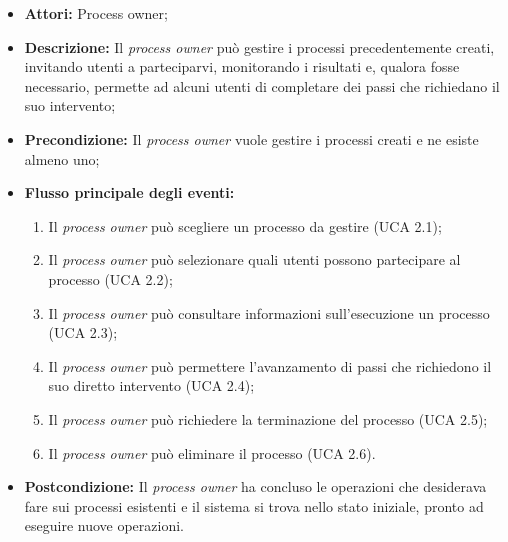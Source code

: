 \begin{itemize}
\item \textbf{Attori:} Process owner;
\item \textbf{Descrizione:}
Il \textit{process owner} può gestire i processi precedentemente creati, invitando utenti a parteciparvi, monitorando i risultati e, qualora fosse necessario, permette ad alcuni utenti di completare dei passi che richiedano il suo intervento;
\item \textbf{Precondizione:}
Il \textit{process owner} vuole gestire i processi creati e ne esiste almeno uno;
\item \textbf{Flusso principale degli eventi:}
\begin{enumerate}
\item Il \textit{process owner} può scegliere un processo da gestire (UCA 2.1);
\item Il \textit{process owner} può selezionare quali utenti possono partecipare al processo (UCA 2.2);
\item Il \textit{process owner} può consultare informazioni sull'esecuzione un processo (UCA 2.3);
\item Il \textit{process owner} può permettere l'avanzamento di passi che richiedono il suo diretto intervento (UCA 2.4);
\item Il \textit{process owner} può richiedere la terminazione del processo (UCA 2.5);
\item Il \textit{process owner} può eliminare il processo (UCA 2.6).
\end{enumerate}
\item \textbf{Postcondizione:}
Il \textit{process owner} ha concluso le operazioni che desiderava fare sui processi esistenti e il sistema si trova nello stato iniziale, pronto ad eseguire nuove operazioni.
\end{itemize}

\hypertarget{A2.1}{}

